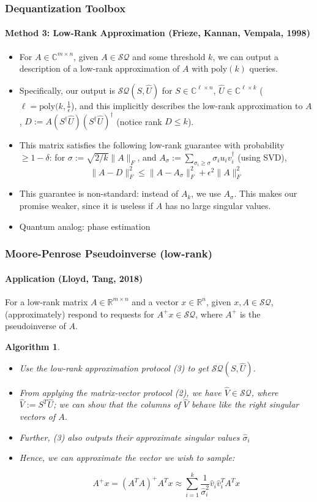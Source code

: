 \documentclass{beamer}
\newcommand\0{\mathbf{0}}
\newcommand\CC{\mathbb{C}}
\newcommand\RR{\mathbb{R}}
\newcommand\<{\langle}
\renewcommand\>{\rangle}
\newtheorem{algorithm}{Algorithm}[theorem]
\begin{document}
\begin{frame}
\frametitle{Dequantization Toolbox}
\framesubtitle{Method 3: Low-Rank Approximation (Frieze, Kannan, Vempala, 1998)}
\begin{itemize}
\item For $A \in \CC^{m\times n}$, given $A \in \mathcal{SQ}$ and some threshold $k$, we can output a description of a low-rank approximation of $A$ with $\text{poly}(k)$ queries.
\item Specifically, our output is $\mathcal{SQ}(S,\hat{U})$ for $S \in \CC^{\ell \times n}$, $\hat{U} \in \CC^{\ell \times k}$ ($\ell = \text{poly}(k,\frac{1}{\epsilon}$), and this implicitly describes the low-rank approximation to $A$, $D := A(S^\dagger\hat{U})(S^\dagger\hat{U})^\dag$ (notice rank $D \leq k$).

\item This matrix satisfies the following low-rank guarantee with probability $\geq 1-\delta$: for $\sigma := \sqrt{2/k}\|A\|_F$, and $A_{\sigma} := \sum_{\sigma_i \geq \sigma} \sigma_iu_iv_i^\dag$ (using SVD), 
$$\|A - D\|_F^2 \leq \|A - A_\sigma\|_F^2 + \epsilon^2\|A\|_F^2$$
\item This guarantee is non-standard: instead of $A_k$, we use $A_\sigma$. This makes our promise weaker, since it is useless if $A$ has no large singular values.
\item Quantum analog: phase estimation
\end{itemize}
\end{frame}

\begin{frame}
\frametitle{Moore-Penrose Pseudoinverse (low-rank)} 	
\framesubtitle{Application (Lloyd, Tang, 2018)}

\begin{problem} For a low-rank matrix $A \in \RR^{m\times n}$
  and a vector $x \in \RR^n$, given $x, A \in \mathcal{SQ}$, (approximately) respond to requests for $A^+x \in \mathcal{SQ}$, where $A^+$ is the pseudoinverse of $A$. 
\end{problem}
\begin{algorithm}   	
\begin{itemize}
\item Use the low-rank approximation protocol (3) to get $\mathcal{SQ}(S,\hat{U})$.

\item From applying the matrix-vector protocol (2), we have $\hat{V} \in \mathcal{SQ}$, where $\hat{V} := S^T\hat{U}$; we can show that the columns of $\hat{V}$ behave like the right singular vectors of $A$. 

\item Further, (3) also outputs their approximate singular values $\hat{\sigma}_i$
 
\item Hence, we can approximate the vector we wish to sample:

$$A^+x = (A^TA)^+A^Tx \approx \sum_{i=1}^k \frac{1}{\hat{\sigma}_i^2}\hat{v}_i\hat{v}_i^T A^Tx$$
\end{itemize}
\end{algorithm}
\end{frame}
\end{document}
